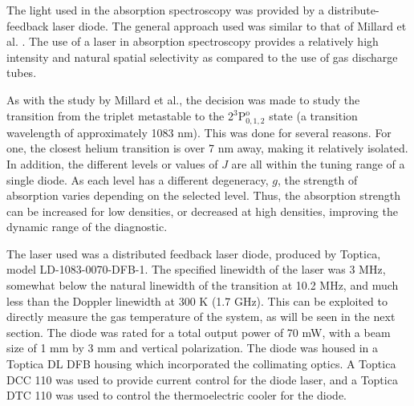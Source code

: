 The light used in the absorption spectroscopy was provided by a
distribute-feedback laser diode. The general approach used was similar to that
of Millard et al. \cite{Millard1998}. The use of a laser in absorption
spectroscopy provides a relatively high intensity and natural spatial
selectivity as compared to the use of gas discharge tubes.

As with the study by Millard et al., the decision was made to study the
transition from the triplet metastable to the 2$^3$P$^\mathrm{o}_{0,1,2}$ state
(a transition wavelength of approximately 1083 nm). This was done for several
reasons. For one, the closest helium transition is over 7 nm away, making it
relatively isolated. In addition, the different levels or values of $J$ are all
within the tuning range of a single diode. As each level has a different
degeneracy, $g$, the strength of absorption varies depending on the selected
level. Thus, the absorption strength can be increased for low densities, or
decreased at high densities, improving the dynamic range of the diagnostic.

The laser used was a distributed feedback laser diode, produced by Toptica,
model LD-1083-0070-DFB-1. The specified linewidth of the laser was 3 MHz,
somewhat below the natural linewidth of the transition at 10.2 MHz, and much
less than the Doppler linewidth at 300 K (1.7 GHz). This can be exploited to
directly measure the gas temperature of the system, as will be seen in the next
section. The diode was rated for a total output power of 70 mW, with a beam size
of 1 mm by 3 mm and vertical polarization. The diode was housed in a Toptica DL
DFB housing which incorporated the collimating optics. A Toptica DCC 110 was
used to provide current control for the diode laser, and a Toptica DTC 110 was
used to control the thermoelectric cooler for the diode.

